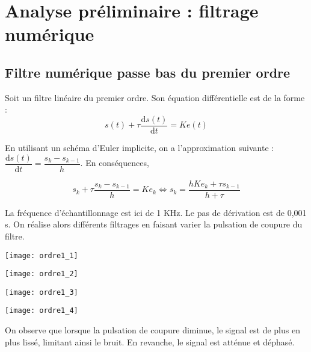\section*{Analyse préliminaire : filtrage numérique}


\subsection*{Filtre numérique passe bas du premier ordre}
Soit un filtre linéaire du premier ordre. Son équation différentielle est de la forme :
$$
s(t)+\tau \dfrac{\text{d} s(t) }{\text{d}t} = K e(t)
$$

En utilisant un schéma d'Euler implicite, on a l'approximation suivante : $\dfrac{\text{d} s(t) }{\text{d}t} = \dfrac{s_{k}-s_{k-1}}{h}$. En conséquences, 

$$
s_k+\tau \dfrac{s_{k}-s_{k-1}}{h} = K e_k \Leftrightarrow 
s_k = \dfrac{h K e_k+\tau s_{k-1}}{h+\tau}
$$

La fréquence d'échantillonnage est ici de 1 KHz. Le pas de dérivation est de 0,001 s. On réalise alors différents filtrages en faisant varier la pulsation de coupure du filtre. 

\begin{minipage}[c]{.43\linewidth}
\begin{center}
\texttt{[image: ordre1\_1]}
\end{center}
\end{minipage} \hfill
\begin{minipage}[c]{.43\linewidth}
\begin{center}
\texttt{[image: ordre1\_2]}
\end{center}
\end{minipage} 

\begin{minipage}[c]{.43\linewidth}
\begin{center}
\texttt{[image: ordre1\_3]}
\end{center}
\end{minipage} \hfill
\begin{minipage}[c]{.43\linewidth}
\begin{center}
\texttt{[image: ordre1\_4]}
\end{center}
\end{minipage}

On observe que lorsque la pulsation de coupure diminue, le signal est de plus en plus lissé, limitant ainsi le bruit. En revanche, le signal est atténue et déphasé. 




